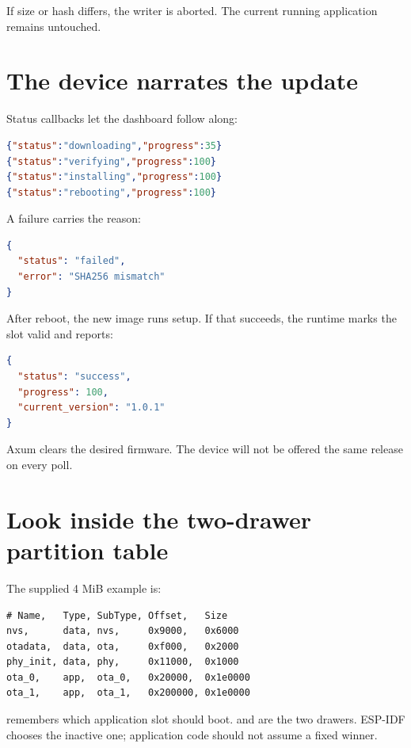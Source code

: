 If size or hash differs, the writer is aborted. The current running application remains untouched.

\section{The device narrates the update}

Status callbacks let the dashboard follow along:

\begin{lstlisting}[language=JSON,numbers=none]
{"status":"downloading","progress":35}
{"status":"verifying","progress":100}
{"status":"installing","progress":100}
{"status":"rebooting","progress":100}
\end{lstlisting}

A failure carries the reason:

\begin{lstlisting}[language=JSON,numbers=none]
{
  "status": "failed",
  "error": "SHA256 mismatch"
}
\end{lstlisting}

After reboot, the new image runs setup. If that succeeds, the runtime marks the slot valid and reports:

\begin{lstlisting}[language=JSON,numbers=none]
{
  "status": "success",
  "progress": 100,
  "current_version": "1.0.1"
}
\end{lstlisting}

Axum clears the desired firmware. The device will not be offered the same release on every poll.

\section{Look inside the two-drawer partition table}

The supplied 4 MiB example is:

\begin{lstlisting}[numbers=none]
# Name,   Type, SubType, Offset,   Size
nvs,      data, nvs,     0x9000,   0x6000
otadata,  data, ota,     0xf000,   0x2000
phy_init, data, phy,     0x11000,  0x1000
ota_0,    app,  ota_0,   0x20000,  0x1e0000
ota_1,    app,  ota_1,   0x200000, 0x1e0000
\end{lstlisting}

 remembers which application slot should boot.  and  are the two drawers. ESP-IDF chooses the inactive one; application code should not assume a fixed winner.

